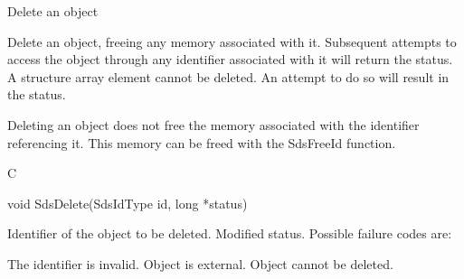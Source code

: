\begin{manroutinedescription}
      Delete an object

      Delete an object, freeing any memory associated with it. Subsequent
      attempts to access the object through any identifier associated with
      it will return the {} status. A structure array %
element cannot
      be deleted. An attempt to do so will result in the {} status.

     Deleting an object does not free the memory associated with the
     identifier referencing it. This memory can be freed with the
     SdsFreeId function.

 
      C

      void SdsDelete(SdsIdType id, long *status)
 
\begin{manparametertable}
  Identifier of the object to be %
deleted.
 Modified status. Possible %
failure codes are:
\end{manparametertable}
\begin{mantwocolumntable}
The identifier is invalid.
Object is external.
Object cannot be deleted.
\end{mantwocolumntable}
\end{manroutinedescription}
